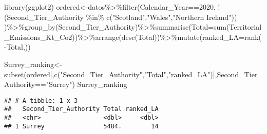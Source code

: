\documentclass[
]{article}
\newenvironment{Shaded}{\begin{snugshade}}{\end{snugshade}}
\newcommand{\AttributeTok}[1]{\textcolor[rgb]{0.77,0.63,0.00}{#1}}
\newcommand{\DecValTok}[1]{\textcolor[rgb]{0.00,0.00,0.81}{#1}}
\newcommand{\FunctionTok}[1]{\textcolor[rgb]{0.00,0.00,0.00}{#1}}
\newcommand{\NormalTok}[1]{#1}
\newcommand{\OtherTok}[1]{\textcolor[rgb]{0.56,0.35,0.01}{#1}}
\newcommand{\SpecialCharTok}[1]{\textcolor[rgb]{0.00,0.00,0.00}{#1}}
\newcommand{\StringTok}[1]{\textcolor[rgb]{0.31,0.60,0.02}{#1}}
\begin{document}
\begin{Shaded}
\begin{Highlighting}[]
\FunctionTok{library}\NormalTok{(ggplot2)}
\NormalTok{ordered}\OtherTok{\textless{}{-}}\NormalTok{datos}\SpecialCharTok{\%\textgreater{}\%}\FunctionTok{filter}\NormalTok{(Calendar\_Year}\SpecialCharTok{==}\DecValTok{2020}\NormalTok{, }\SpecialCharTok{!}\NormalTok{(Second\_Tier\_Authority }\SpecialCharTok{\%in\%} \FunctionTok{c}\NormalTok{(}\StringTok{"Scotland"}\NormalTok{,}\StringTok{"Wales"}\NormalTok{,}\StringTok{"Northern Ireland"}\NormalTok{)) )}\SpecialCharTok{\%\textgreater{}\%}\FunctionTok{group\_by}\NormalTok{(Second\_Tier\_Authority)}\SpecialCharTok{\%\textgreater{}\%}\FunctionTok{summarise}\NormalTok{(}\AttributeTok{Total=}\FunctionTok{sum}\NormalTok{(Territorial\_Emissions\_Kt\_Co2))}\SpecialCharTok{\%\textgreater{}\%}\FunctionTok{arrange}\NormalTok{(}\FunctionTok{desc}\NormalTok{(Total))}\SpecialCharTok{\%\textgreater{}\%}\FunctionTok{mutate}\NormalTok{(}\AttributeTok{ranked\_LA=}\FunctionTok{rank}\NormalTok{(}\SpecialCharTok{{-}}\NormalTok{Total,))}

\NormalTok{Surrey\_ranking}\OtherTok{\textless{}{-}}\FunctionTok{subset}\NormalTok{(ordered[,}\FunctionTok{c}\NormalTok{(}\StringTok{"Second\_Tier\_Authority"}\NormalTok{,}\StringTok{"Total"}\NormalTok{,}\StringTok{"ranked\_LA"}\NormalTok{)],Second\_Tier\_Authority}\SpecialCharTok{==}\StringTok{"Surrey"}\NormalTok{)}
\NormalTok{Surrey\_ranking}
\end{Highlighting}
\end{Shaded}

\begin{verbatim}
## # A tibble: 1 x 3
##   Second_Tier_Authority Total ranked_LA
##   <chr>                 <dbl>     <dbl>
## 1 Surrey                5484.        14
\end{verbatim}

\begin{Shaded}
\end{Shaded}
\end{document}
